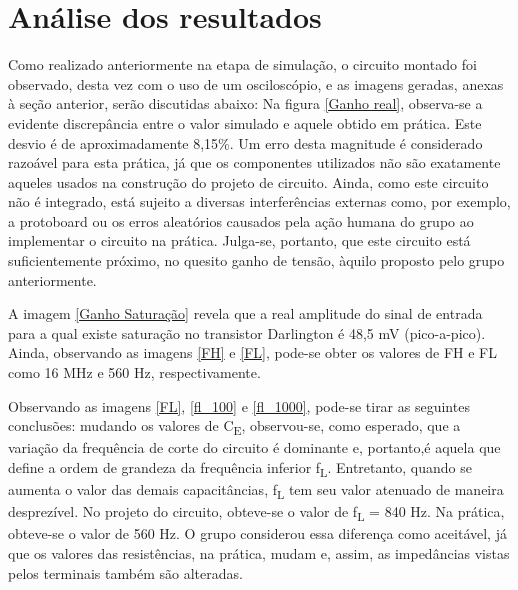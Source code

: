 \documentclass[journal, a4paper]{IEEEtran}
\newcommand\tab[1][1cm]{\hspace*{#1}}
\begin{document}
\section{Análise dos resultados}
    \tab Como realizado anteriormente na etapa de simulação, o circuito montado foi observado, desta vez com o uso de um osciloscópio, e as imagens geradas, anexas à seção anterior, serão discutidas abaixo:
     Na figura \ref{Ganho real}, observa-se a evidente discrepância entre o valor simulado e aquele obtido em prática. Este desvio é de aproximadamente 8,15\%. Um erro desta magnitude é considerado razoável para esta prática, já que os componentes utilizados não são exatamente aqueles usados na construção do projeto de circuito. Ainda, como este circuito não é integrado, está sujeito a diversas interferências externas como, por exemplo, a protoboard ou os erros aleatórios causados pela ação humana do grupo ao implementar o circuito na prática. Julga-se, portanto, que este circuito está suficientemente próximo, no quesito ganho de tensão, àquilo proposto pelo grupo anteriormente.
    
    \tab A imagem \ref{Ganho Saturação} revela que a real amplitude do sinal de entrada para a qual existe saturação no transistor Darlington é 48,5 mV (pico-a-pico). Ainda, observando as imagens \ref{FH} e \ref{FL}, pode-se obter os valores de FH e FL como 16 MHz e 560 Hz, respectivamente.
    
    \tab Observando as imagens \ref{FL}, \ref{fl_100} e \ref{fl_1000}, pode-se tirar as seguintes conclusões: mudando os valores de C\textsubscript{E}, observou-se, como esperado, que a variação da frequência de corte do circuito é dominante e, portanto,é aquela que define a ordem de grandeza da frequência inferior f\textsubscript{L}. Entretanto, quando se aumenta o valor das demais capacitâncias, f\textsubscript{L} tem seu valor atenuado de maneira desprezível. No projeto do circuito, obteve-se o valor de f\textsubscript{L} = 840 Hz. Na prática, obteve-se o valor de 560 Hz. O grupo considerou essa diferença como aceitável, já que os valores das resistências, na prática, mudam e, assim, as impedâncias vistas pelos terminais também são alteradas.
    
    \tab 
\end{document}
